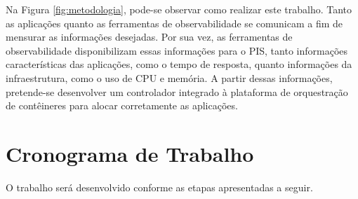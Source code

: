 Na Figura \ref{fig:metodologia}, pode-se observar como  realizar este trabalho. Tanto as aplicações quanto as ferramentas de observabilidade se comunicam a fim de mensurar as informações desejadas. Por sua vez, as ferramentas de observabilidade disponibilizam essas informações para o PIS, tanto informações características das aplicações, como o tempo de resposta, quanto informações da infraestrutura, como o uso de CPU e memória. A partir dessas informações, pretende-se desenvolver um controlador integrado à plataforma de orquestração de contêineres para alocar corretamente as aplicações.

\section{Cronograma de Trabalho}

O trabalho será desenvolvido conforme as etapas apresentadas a seguir.

